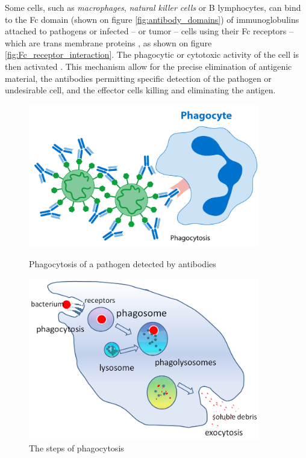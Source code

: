 Some cells, such as \emph{macrophages}, \emph{natural killer cells} or B lymphocytes, 
can bind to the Fc domain (shown on figure \ref{fig:antibody_domains})
of immunoglobulins attached to pathogens or infected -- or tumor -- cells
using their Fc receptors -- which are trans membrane proteins \cite{fridman_fc_1991}, 
as shown on figure \ref{fig:Fc_receptor_interaction}. 
The phagocytic or cytotoxic activity of the cell is then activated \cite{tay_antibody-dependent_2019}.
This mechanism allow for the precise elimination of antigenic material, the antibodies
permitting specific detection of the pathogen or undesirable cell, and the effector cells
killing and eliminating the antigen.

\begin{figure}[H]
    \begin{minipage}{0.49\textwidth}
        \centering
        \includegraphics[width=0.9\textwidth]{../Images/phagocytosis.png}   
        \caption{Phagocytosis of a pathogen detected by antibodies}
        \label{fig:phagocytosis}
    \end{minipage}\hfill
    \begin{minipage}{0.49\textwidth}
        \centering
        \includegraphics[width=0.9\textwidth]{../Images/phagocytosis_steps.png}   
        \caption{The steps of phagocytosis}
        \label{fig:phagocytosis_steps}
    \end{minipage}
\end{figure}


